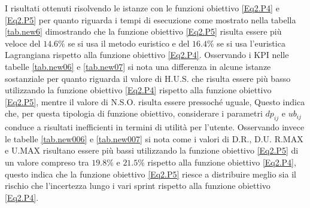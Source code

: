 \documentclass[12pt,a4paper,openright,twoside]{book}
\begin{document}
I risultati ottenuti risolvendo le istanze con le funzioni obiettivo \eqref{Eq2.P4} e \eqref{Eq2.P5} per quanto riguarda i tempi di esecuzione come mostrato nella tabella \ref{tab.new6} dimostrando che la funzione obiettivo \eqref{Eq2.P5} risulta essere più veloce del $14.6\%$ se si usa il metodo euristico e del $16.4\%$ se si usa l'euristica Lagrangiana rispetto alla funzione obiettivo \eqref{Eq2.P4}.
Osservando i KPI nelle tabelle \ref{tab.new06} e \ref{tab.new07} si nota una differenza in alcune istanze sostanziale per quanto riguarda il valore di H.U.S. che risulta essere più basso utilizzando la funzione obiettivo \eqref{Eq2.P4} rispetto alla funzione obiettivo \eqref{Eq2.P5}, mentre il valore di N.S.O. risulta essere pressoché uguale, Questo indica che, per questa tipologia di funzione obiettivo, considerare i parametri $dp_{ij}$ e $ub_{ij}$ conduce a risultati inefficienti in termini di utilità per l'utente.
Osservando invece le tabelle \ref{tab.new006} e \ref{tab.new007} si nota come i valori di D.R., D.U. R.MAX e U.MAX risultano essere più bassi utilizzando la funzione obiettivo \eqref{Eq2.P5} di un valore compreso tra $19.8\%$ e $21.5\%$ rispetto alla funzione obiettivo \eqref{Eq2.P4}, questo indica che la funzione obiettivo \eqref{Eq2.P5} riesce a distribuire meglio sia il rischio che l'incertezza lungo i vari sprint rispetto alla funzione obiettivo \eqref{Eq2.P4}.
\end{document}
